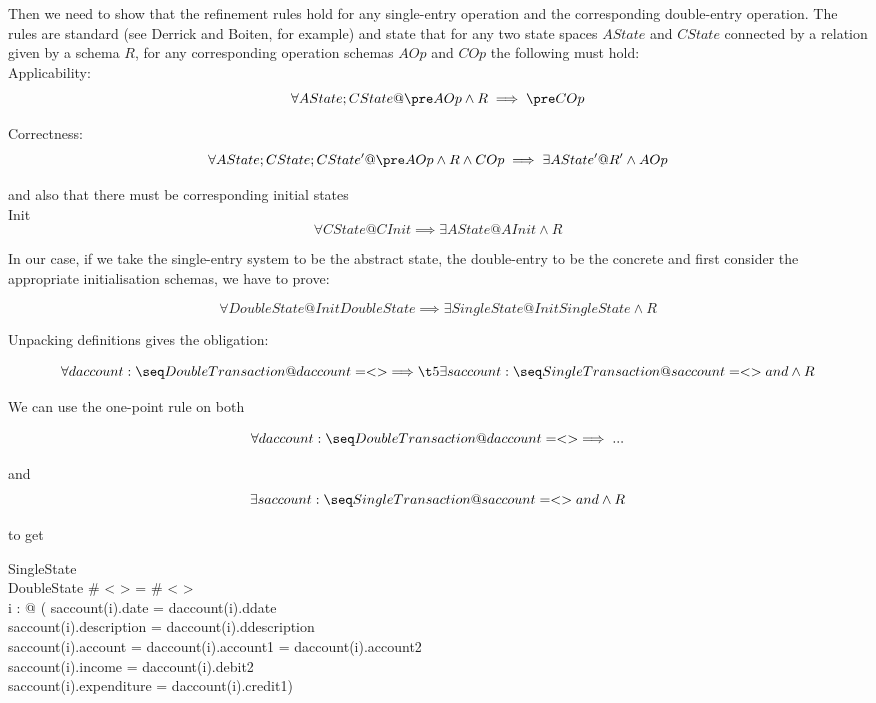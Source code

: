 \documentclass[11pt]{amsart}
\begin{document}
Then we need to show that the refinement rules hold for any single-entry operation and the  corresponding double-entry operation. The rules are standard (see Derrick and Boiten, for example) and state that for any two state spaces $AState$ and $CState$ connected by a relation given by a schema $R$, for any corresponding operation schemas $AOp$ and $COp$ the following must hold:\\

\noindent Applicability:
\[
\forall AState; CState @ \pre AOp \land R \implies \pre COp
\]

\noindent Correctness:
\[
\forall AState; CState; CState' @ \pre AOp \land R \land COp \implies \exists AState' @ R' \land AOp
\]

\noindent and also that there must be corresponding initial states\\

\noindent Init
\[
\forall CState @ CInit \implies \exists AState @ AInit \land R
\]

In our case, if we take the single-entry system to be the abstract state, the double-entry to be the concrete and first consider the appropriate initialisation schemas, we have to prove:

\[
\forall DoubleState  @ InitDoubleState \implies \exists SingleState  @ InitSingleState \land R
\]

Unpacking definitions gives the obligation:

\[
\forall daccount : \seq DoubleTransaction @ daccount = < > \implies\\
\t5 \exists saccount : \seq SingleTransaction @ saccount = < > and \land R
\]

We can use the one-point rule on both

\[
\forall daccount : \seq DoubleTransaction @ daccount = < > \implies...
\]

and
\[
\exists saccount : \seq SingleTransaction @ saccount = < > and \land R
\]

to get

\begin{schema}{}
SingleState\\
DoubleState
\where
\# < > = \# < >\\
\forall i : \dom < > @ (
saccount(i).date = daccount(i).ddate \land\\
saccount(i).description = daccount(i).ddescription \land\\
saccount(i).account = daccount(i).account1 = daccount(i).account2 \land\\
saccount(i).income = daccount(i).debit2 \land\\
saccount(i).expenditure = daccount(i).credit1)
\end{schema}
\end{document}
